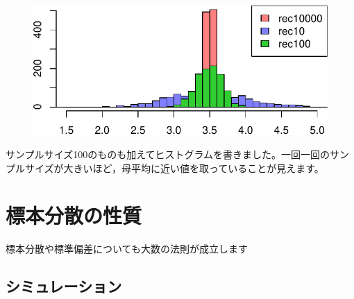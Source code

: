 \documentclass[
  letterpaper,
  DIV=11,
  numbers=noendperiod]{scrreprt}
\begin{document}
\begin{figure}[H]

{\centering \includegraphics{6_hyohon_files/figure-pdf/unnamed-chunk-6-1.pdf}

}

\end{figure}

サンプルサイズ100のものも加えてヒストグラムを書きました。一回一回のサンプルサイズが大きいほど，母平均に近い値を取っていることが見えます。

\hypertarget{ux6a19ux672cux5206ux6563ux306eux6027ux8cea}{%
\section{標本分散の性質}\label{ux6a19ux672cux5206ux6563ux306eux6027ux8cea}}

標本分散や標準偏差についても大数の法則が成立します

\hypertarget{ux30b7ux30dfux30e5ux30ecux30fcux30b7ux30e7ux30f3}{%
\subsection{シミュレーション}\label{ux30b7ux30dfux30e5ux30ecux30fcux30b7ux30e7ux30f3}}
\end{document}
